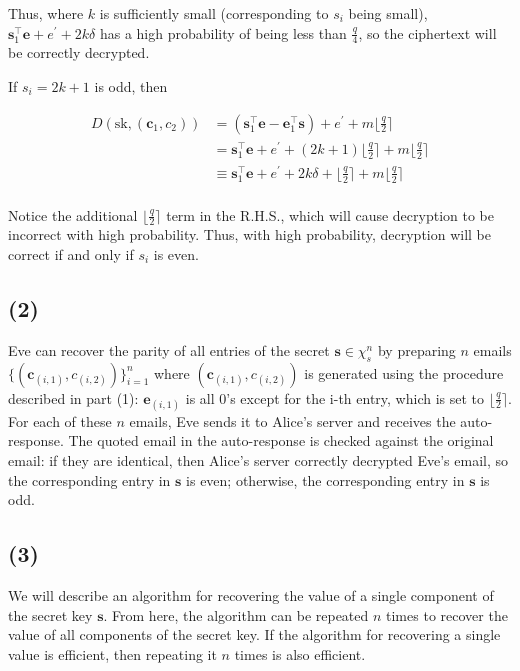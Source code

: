 \documentclass{article}
\newcommand{\round}[1]{\lfloor {#1} \rceil}
\begin{document}
Thus, where $k$ is sufficiently small (corresponding to $s_i$ being small), $\mathbf{s}_1^\intercal\mathbf{e} + e^\prime + 2k\delta$ has a high probability of being less than $\frac{q}{4}$, so the ciphertext will be correctly decrypted.

If $s_i = 2k + 1$ is odd, then

$$
\begin{aligned}
D(\text{sk}, (\mathbf{c}_1, c_2)) 
&= (\mathbf{s}_1^\intercal\mathbf{e} - \mathbf{e}_1^\intercal\mathbf{s}) + e^\prime + m\round{\frac{q}{2}} \\
&= \mathbf{s}_1^\intercal\mathbf{e} + e^\prime + (2k + 1)\round{\frac{q}{2}} + m\round{\frac{q}{2}} \\
&\equiv  \mathbf{s}_1^\intercal\mathbf{e} + e^\prime + 2k\delta + \round{\frac{q}{2}} + m\round{\frac{q}{2}} \\
\end{aligned}
$$

Notice the additional $\round{\frac{q}{2}}$ term in the R.H.S., which will cause decryption to be incorrect with high probability. Thus, with high probability, decryption will be correct if and only if $s_i$ is even.

\subsection*{(2)}
Eve can recover the parity of all entries of the secret $\mathbf{s} \in \chi_s^n$ by preparing $n$ emails $\{(\mathbf{c}_{(i, 1)}, c_{(i, 2)})\}_{i=1}^{n}$ where $(\mathbf{c}_{(i, 1)}, c_{(i, 2)})$ is generated using the procedure described in part (1): $\mathbf{e}_{(i, 1)}$ is all 0's except for the i-th entry, which is set to $\round{\frac{q}{2}}$. For each of these $n$ emails, Eve sends it to Alice's server and receives the auto-response. The quoted email in the auto-response is checked against the original email: if they are identical, then Alice's server correctly decrypted Eve's email, so the corresponding entry in $\mathbf{s}$ is even; otherwise, the corresponding entry in $\mathbf{s}$ is odd.

\subsection*{(3)}
We will describe an algorithm for recovering the value of a single component of the secret key $\mathbf{s}$. From here, the algorithm can be repeated $n$ times to recover the value of all components of the secret key. If the algorithm for recovering a single value is efficient, then repeating it $n$ times is also efficient.
\end{document}
